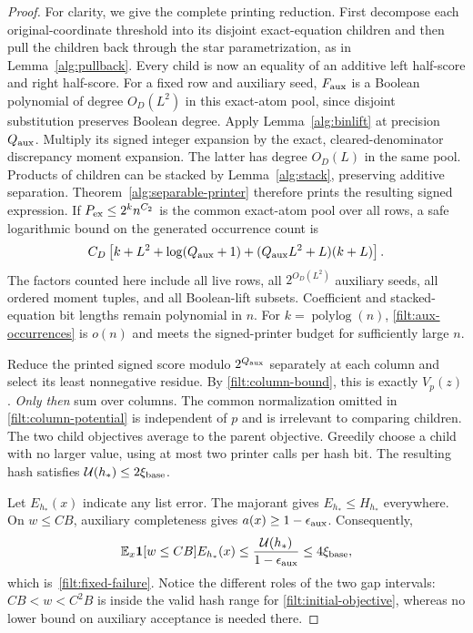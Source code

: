 \documentclass[11pt,letterpaper]{article}
\theoremstyle{definition}
\theoremstyle{remark}
\begin{document}
\begin{proof}
For clarity, we give the complete printing reduction.  First decompose
each original-coordinate threshold into its disjoint exact-equation
children and then pull the children back through the star
parametrization, as in Lemma~\ref{alg:pullback}.  Every child is now
an equality of an additive left half-score and right half-score.
For a fixed row and auxiliary seed, $F_{\rm aux}$ is a Boolean
polynomial of degree $O_D(L^2)$ in this exact-atom pool, since disjoint
substitution preserves Boolean degree.  Apply
Lemma~\ref{alg:binlift} at precision $Q_{\rm aux}$.  Multiply its
signed integer expansion by the exact, cleared-denominator discrepancy
moment expansion.  The latter has degree $O_D(L)$ in the same pool.
Products of children can be stacked by Lemma~\ref{alg:stack},
preserving additive separation.  Theorem~\ref{alg:separable-printer}
therefore prints the resulting signed expression.
If $P_{\rm ex}\le2^k n^{C_2}$ is the common exact-atom pool over all
rows, a safe logarithmic bound on the generated occurrence count is
\begin{equation}\label{filt:aux-occurrences}
 C_D\left[k+L^2+\log(Q_{\rm aux}+1)
       +(Q_{\rm aux}L^2+L)(k+L)\right].
\end{equation}
The factors counted here include all live rows, all
$2^{O_D(L^2)}$ auxiliary seeds, all ordered moment tuples, and all
Boolean-lift subsets.  Coefficient and stacked-equation bit lengths
remain polynomial in $n$.  For $k=\operatorname{polylog}(n)$,
\eqref{filt:aux-occurrences} is $o(n)$ and meets the signed-printer
budget for sufficiently large $n$.

Reduce the printed signed score modulo $2^{Q_{\rm aux}}$ separately
at each column and select its least nonnegative residue.  By
\eqref{filt:column-bound}, this is exactly $V_p(z)$.  \emph{Only
then} sum over columns.  The common normalization omitted in
\eqref{filt:column-potential} is independent of $p$ and is irrelevant
to comparing children.  The two child objectives average to the
parent objective.  Greedily choose a child with no larger value,
using at most two printer calls per hash bit.  The resulting hash
satisfies $\mathcal U(h_*)\le2\xi_{\rm base}$.

Let $E_{h_*}(x)$ indicate any list error.  The majorant gives
$E_{h_*}\le H_{h_*}$ everywhere.  On $w\le CB$, auxiliary
completeness gives $a(x)\ge1-\epsilon_{\rm aux}$.  Consequently,
\[
 \mathbb E_x\mathbf1[w\le CB]E_{h_*}(x)
 \le \frac{\mathcal U(h_*)}{1-\epsilon_{\rm aux}}
 \le4\xi_{\rm base},
\]
which is~\eqref{filt:fixed-failure}.  Notice the different roles of the
two gap intervals: $CB<w<C^2B$ is inside the valid hash range for
\eqref{filt:initial-objective}, whereas no lower bound on auxiliary
acceptance is needed there.
\end{proof}
\end{document}
